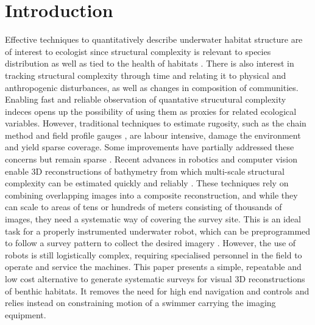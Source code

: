 \section{Introduction} 


Effective techniques to quantitatively describe underwater habitat structure are of interest to ecologist since structural complexity is relevant to species distribution \cite{pending} as well as tied to the health of habitats \cite{pending}. There is also interest in tracking structural complexity through time and relating it to physical and anthropogenic disturbances, as well as changes in composition of communities. Enabling fast and reliable observation of quantative strucutural complexity indeces opens up the possibility of using them as proxies for related ecological variables.
However, traditional techniques to estimate rugosity, such as the chain method \cite{Luckhurst_1978} \cite{Friedlander_1998} and field profile gauges \cite{McCormick_1994}, are labour intensive, damage the environment and yield sparse coverage. Some improvements have partially addressed these concerns but remain sparse \cite{Dustan_2013}.  Recent advances in robotics and computer vision enable 3D reconstructions of bathymetry from which multi-scale structural complexity can be estimated quickly and reliably \cite{Friedman_2012}. These techniques rely on combining overlapping images into a composite reconstruction, and while they can scale to areas of tens or hundreds of meters consisting of thousands of images, they need a systematic way of covering the survey site. This is an ideal task for a properly instrumented underwater robot, which can be preprogrammed to follow a survey pattern to collect the desired imagery \cite{Williams_2012}. However, the use of robots is still logistically complex, requiring specialised personnel in the field to operate and service the machines.
This paper presents a simple, repeatable and low cost alternative to generate systematic surveys for visual 3D reconstructions of benthic habitats. It removes the need for high end navigation and controls and relies instead on constraining motion of a swimmer carrying the imaging equipment. 

